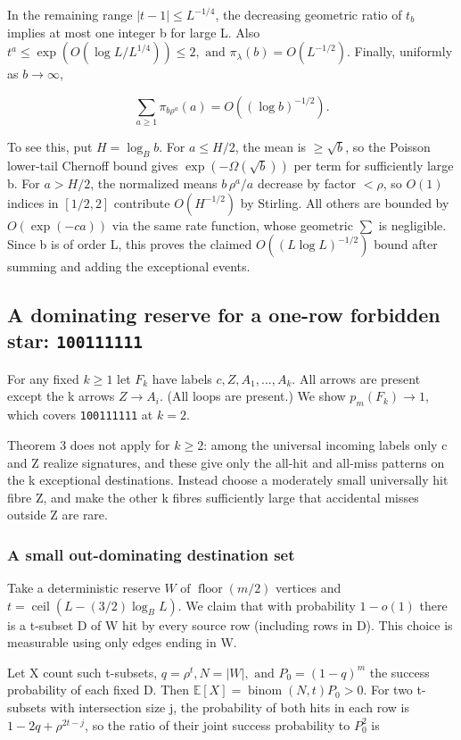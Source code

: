 \documentclass[11pt]{article}
\begin{document}
In the remaining range $|t-1|\leq L^{-1/4}$, the decreasing geometric ratio of $t_{b}$ implies at most one integer b for large L. Also $t^{a}\leq \exp (O(\log  L/L^{1/4}))\leq 2, \text{ and } \pi _{\lambda }(b)=O(L^{-1/2})$. Finally, uniformly as $b\to \infty $,

\[
\sum_{a\geq1}\pi_{b\rho^a}(a)=O((\log b)^{-1/2}).
\]

To see this, put $H=\log _{B} b$. For $a\leq H/2$, the mean is $\geq \sqrt{b}$, so the Poisson lower-tail Chernoff bound gives $\exp (-\Omega (\sqrt{b}))$ per term for sufficiently large b. For $a>H/2$, the normalized means $b\,\rho ^{a}/a$ decrease by factor $<\rho $, so $O(1)$ indices in $[1/2,2]$ contribute $O(H^{-1/2})$ by Stirling. All others are bounded by $O(\exp (-c a))$ via the same rate function, whose geometric $\sum $ is negligible. Since b is of order L, this proves the claimed $O((L \log  L)^{-1/2})$ bound after summing and adding the exceptional events.

\subsection{A dominating reserve for a one-row forbidden star: \texttt{100111111}}

For any fixed $k\geq 1$ let $F_{k}$ have labels $c,Z,A_{1},...,A_{k}$. All arrows are present except the k arrows $Z\to A_{i}$. (All loops are present.) We show $p_{m}(F_{k})\to 1$, which covers \texttt{100111111} at $k=2$.

Theorem 3 does not apply for $k\geq 2$: among the universal incoming labels only c and Z realize signatures, and these give only the all-hit and all-miss patterns on the k exceptional destinations. Instead choose a moderately small universally hit fibre Z, and make the other k fibres sufficiently large that accidental misses outside Z are rare.

\subsubsection{A small out-dominating destination set}

Take a deterministic reserve $W \text{ of } \operatorname{floor}(m/2)$ vertices and $t=\operatorname{ceil}(L-(3/2)\log _{B} L)$. We claim that with probability $1-o(1)$ there is a t-subset D of W hit by every source row (including rows in D). This choice is measurable using only edges ending in W.

Let X count such t-subsets, $q=\rho ^{t}, N=|W|, \text{ and } P_{0}=(1-q)^{m}$ the success probability of each fixed D. Then $\mathbb E[X]=\operatorname{binom}(N,t)P_{0}>0$. For two t-subsets with intersection size j, the probability of both hits in each row is $1-2q+\rho ^{2t-j}$, so the ratio of their joint success probability to $P_{0}^{2}$ is
\end{document}
